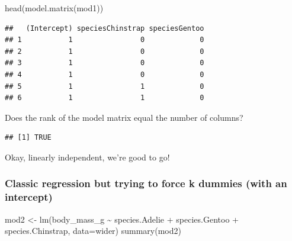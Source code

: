\documentclass[
]{book}
\newenvironment{Shaded}{\begin{snugshade}}{\end{snugshade}}
\newcommand{\AttributeTok}[1]{\textcolor[rgb]{0.77,0.63,0.00}{#1}}
\newcommand{\FunctionTok}[1]{\textcolor[rgb]{0.00,0.00,0.00}{#1}}
\newcommand{\NormalTok}[1]{#1}
\newcommand{\OtherTok}[1]{\textcolor[rgb]{0.56,0.35,0.01}{#1}}
\newcommand{\SpecialCharTok}[1]{\textcolor[rgb]{0.00,0.00,0.00}{#1}}
\begin{document}
\begin{Shaded}
\begin{Highlighting}[]
\FunctionTok{head}\NormalTok{(}\FunctionTok{model.matrix}\NormalTok{(mod1))}
\end{Highlighting}
\end{Shaded}

\begin{verbatim}
##   (Intercept) speciesChinstrap speciesGentoo
## 1           1                0             0
## 2           1                0             0
## 3           1                0             0
## 4           1                0             0
## 5           1                1             0
## 6           1                1             0
\end{verbatim}

Does the rank of the model matrix equal the number of columns?

\begin{Shaded}
\end{Shaded}

\begin{verbatim}
## [1] TRUE
\end{verbatim}

Okay, linearly independent, we're good to go!

\hypertarget{classic-regression-but-trying-to-force-k-dummies-with-an-intercept}{%
\subsubsection{Classic regression but trying to force k dummies (with an intercept)}\label{classic-regression-but-trying-to-force-k-dummies-with-an-intercept}}

\begin{Shaded}
\begin{Highlighting}[]
\NormalTok{mod2 }\OtherTok{\textless{}{-}} \FunctionTok{lm}\NormalTok{(body\_mass\_g }\SpecialCharTok{\textasciitilde{}}\NormalTok{ species.Adelie }\SpecialCharTok{+}\NormalTok{ species.Gentoo }\SpecialCharTok{+}\NormalTok{ species.Chinstrap, }\AttributeTok{data=}\NormalTok{wider)}
\FunctionTok{summary}\NormalTok{(mod2)}
\end{Highlighting}
\end{Shaded}
\end{document}
